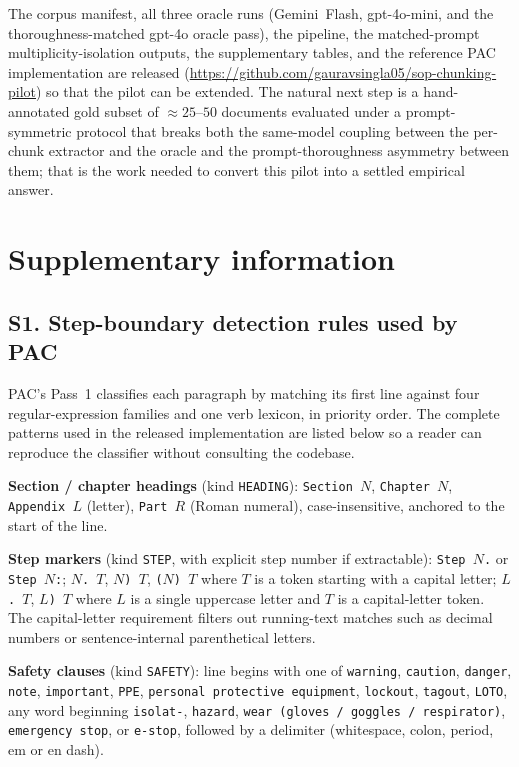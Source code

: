 \documentclass[make,article,submit,oneauthor,pdftex]{Definitions/mdpi}
\begin{document}
The corpus manifest, all three oracle runs (Gemini~Flash,
gpt-4o-mini, and the thoroughness-matched gpt-4o oracle pass), the
pipeline, the matched-prompt multiplicity-isolation outputs, the
supplementary tables, and the reference PAC implementation are
released
(\url{https://github.com/gauravsingla05/sop-chunking-pilot}) so that
the pilot can be extended. The natural next step is a hand-annotated
gold subset of $\approx 25$--$50$ documents evaluated under a
prompt-symmetric protocol that breaks both the same-model coupling
between the per-chunk extractor and the oracle and the
prompt-thoroughness asymmetry between them; that is the work needed to
convert this pilot into a settled empirical answer.

\section{Supplementary information}

\subsection{S1. Step-boundary detection rules used by PAC}

PAC's Pass~1 classifies each paragraph by matching its first line
against four regular-expression families and one verb lexicon, in
priority order. The complete patterns used in the released
implementation are listed below so a reader can reproduce the
classifier without consulting the codebase.

\textbf{Section / chapter headings} (kind \texttt{HEADING}):
\texttt{Section~$N$}, \texttt{Chapter~$N$}, \texttt{Appendix~$L$}
(letter), \texttt{Part~$R$} (Roman numeral), case-insensitive,
anchored to the start of the line.

\textbf{Step markers} (kind \texttt{STEP}, with explicit step number
if extractable): \texttt{Step~$N$.} or \texttt{Step~$N$:};
\texttt{$N$.~$T$}, \texttt{$N$)~$T$}, \texttt{($N$)~$T$} where $T$ is
a token starting with a capital letter; \texttt{$L$.~$T$},
\texttt{$L$)~$T$} where $L$ is a single uppercase letter and $T$ is a
capital-letter token. The capital-letter requirement filters out
running-text matches such as decimal numbers or sentence-internal
parenthetical letters.

\textbf{Safety clauses} (kind \texttt{SAFETY}): line begins with one
of \texttt{warning}, \texttt{caution}, \texttt{danger}, \texttt{note},
\texttt{important}, \texttt{PPE}, \texttt{personal protective
equipment}, \texttt{lockout}, \texttt{tagout}, \texttt{LOTO}, any word
beginning \texttt{isolat-}, \texttt{hazard}, \texttt{wear (gloves /
goggles / respirator)}, \texttt{emergency stop}, or \texttt{e-stop},
followed by a delimiter (whitespace, colon, period, em or en dash).
\end{document}
